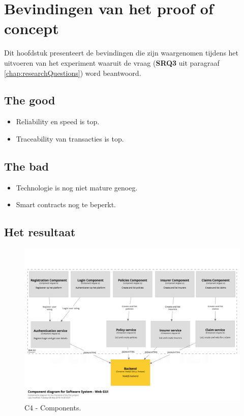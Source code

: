 \chapter{Bevindingen van het proof of concept}\label{chap:q2}
Dit hoofdstuk presenteert de bevindingen die zijn waargenomen tijdens het uitvoeren van het experiment waaruit de vraag \researchQuestionThree (\textbf{SRQ3} uit paragraaf \ref{chap:researchQuestions}) word beantwoord.

\section{The good}
\begin{itemize}
  \item Reliability en speed is top.
  \item Traceability van transacties is top.
\end{itemize}

\section{The bad}
\begin{itemize}
  \item Technologie is nog niet mature genoeg.
  \item Smart contracts nog te beperkt.
\end{itemize}

\newpage

\section{Het resultaat}
\begin{figure}[h!]
    \begin{center}
        \includegraphics[width=\paperwidth-200]{images/components}
        \caption{C4 - Components.}
        \label{fig:c4Compomnents}
    \end{center}
\end{figure}